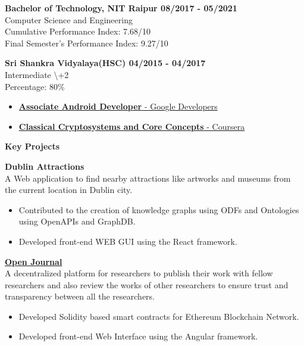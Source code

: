 \documentclass{article}
\begin{document}
\noindent \normalsize \textbf{Bachelor of Technology, NIT Raipur \hfill 08/2017 - 05/2021}\\
Computer Science and Engineering \\
Cumulative Performance Index: 7.68/10 \\
Final Semester's Performance Index: 9.27/10
\vspace{5pt}

\noindent \normalsize \textbf{Sri Shankra Vidyalaya(HSC) \hfill 04/2015 - 04/2017}\\
Intermediate \textbackslash+2 \\
Percentage: 80\% \\

\begin{itemize}[noitemsep,nolistsep,leftmargin=*]
    \item { \normalsize \href{https://www.credential.net/623b189c-719c-4845-b489-1b1618d4da79}{\textbf{Associate Android Developer} - Google Developers } }
    \item { \normalsize \href{https://www.coursera.org/account/accomplishments/certificate/X4CNCJXC335V}{\textbf{Classical Cryptosystems and Core Concepts} - Coursera} }
\end{itemize}
\vspace{5pt}
\noindent \large \textbf{\textcolor{NavyBlue}{Key Projects}} \vspace{5pt}

\noindent \normalsize \textbf{Dublin Attractions} \\
\noindent \normalsize A Web application to find nearby attractions like artworks and museums from the current location in Dublin city.
\begin{itemize}
    \item Contributed to the creation of knowledge graphs using ODFs and Ontologies using OpenAPIs and GraphDB. 
    \item Developed front-end WEB GUI using the React framework.
\end{itemize}
\vspace{5pt}

\noindent \normalsize \href{https://github.com/kdpisda/scientific-journal-blockchain}{\textbf{Open Journal}} \\
\noindent \normalsize A decentralized platform for researchers to publish their work with fellow researchers and also review the works of other researchers to ensure trust and transparency between all the researchers.
\begin{itemize}
    \item Developed Solidity based smart contracts for Ethereum Blockchain Network.
    \item Developed front-end Web Interface using the Angular framework.
\end{itemize}
\vspace{5pt}
\end{document}

